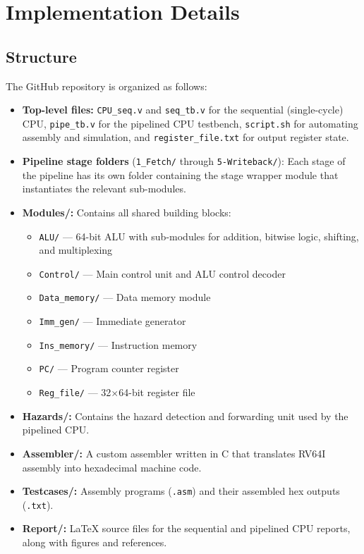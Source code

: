 \documentclass[journal]{IEEEtran}
\begin{document}
\section{Implementation Details}

\subsection{Structure}
The GitHub repository is organized as follows:

\begin{itemize}
    \item \textbf{Top-level files:} \texttt{CPU\_seq.v} and \texttt{seq\_tb.v}
          for the sequential (single-cycle) CPU, \texttt{pipe\_tb.v} for the
          pipelined CPU testbench, \texttt{script.sh} for automating assembly
          and simulation, and \texttt{register\_file.txt} for output register
          state.

    \item \textbf{Pipeline stage folders} (\texttt{1\_Fetch/} through
          \texttt{5-Writeback/}): Each stage of the pipeline has its own folder
          containing the stage wrapper module that instantiates the relevant
          sub-modules.

    \item \textbf{Modules/:} Contains all shared building blocks:
          \begin{itemize}
              \item \texttt{ALU/} --- 64-bit ALU with sub-modules for addition,
                    bitwise logic, shifting, and multiplexing
              \item \texttt{Control/} --- Main control unit and ALU control decoder
              \item \texttt{Data\_memory/} --- Data memory module
              \item \texttt{Imm\_gen/} --- Immediate generator
              \item \texttt{Ins\_memory/} --- Instruction memory
              \item \texttt{PC/} --- Program counter register
              \item \texttt{Reg\_file/} --- 32$\times$64-bit register file
          \end{itemize}

    \item \textbf{Hazards/:} Contains the hazard detection and
          forwarding unit used by the pipelined CPU.

    \item \textbf{Assembler/:} A custom assembler written in C that
          translates RV64I assembly into hexadecimal machine code.

    \item \textbf{Testcases/:} Assembly programs (\texttt{.asm}) and
          their assembled hex outputs (\texttt{.txt}).

    \item \textbf{Report/:} LaTeX source files for the sequential and
          pipelined CPU reports, along with figures and references.
\end{itemize}
\end{document}
